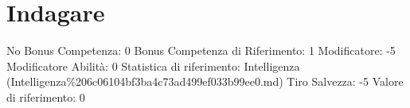 \section{Indagare}\label{indagare}

\begin{description}
\tightlist
\item[Tags: ABI]
No Bonus Competenza: 0 Bonus Competenza di Riferimento: 1 Modificatore:
-5 Modificatore Abilità: 0 Statistica di riferimento: Intelligenza
(Intelligenza\%206c06104bf3ba4c73ad499ef033b99ee0.md) Tiro Salvezza: -5
Valore di riferimento: 0
\end{description}
